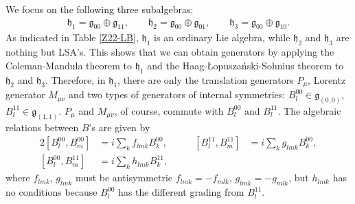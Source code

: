 \documentclass[a4paper,12pt]{article}
\def\nn{\nonumber}
\def\g{\mathfrak{g}}
\def\h{\mathfrak{h}}
\def\HLS{Haag-\L opusza\'nski-Sohnius }
\def\CM{Coleman-Mandula }
\theoremstyle{plain}
\theoremstyle{definition}
\begin{document}
We focus on the following three subalgebras:
\begin{align*}
 \h_1=\g_{00}\oplus\g_{11},\qquad  \h_2=\g_{00}\oplus\g_{01},\qquad \h_3=\g_{00}\oplus\g_{10}.
\end{align*}
As indicated in Table \ref{Z22-LB}, $\h_1$ is an ordinary Lie algebra, while $\h_2$ and $\h_3$ are nothing but LSA's. 
This shows that we can obtain generators by applying the \CM theorem to $\h_1$ and the \HLS theorem to $\h_2$ and $\h_3$. 
Therefore, in $\h_1$, there are only the translation generators $P_\mu$, Lorentz generator $M_{\mu\nu}$ and two types of generators of internal symmetries: $B_l^{00}\in \g_{(0,0)}$, $B_l^{11}\in\g_{(1,1)}$. 
$P_\mu$ and $M_{\mu\nu}$, of course, commute with $B^{00}_l$ and $B^{11}_l$.
The algebraic relations between $B$'s are given by
\begin{alignat}{2}
 [B_l^{00},B_m^{00}]&=i \sum_k f_{lmk} B_k^{00},\qquad &
 [B_l^{11},B_m^{11}]&=i \sum_k g_{lmk} B_k^{00},\nn\\
 [B_l^{00},B_m^{11}]&=i \sum_k h_{lmk} B_k^{11},
\end{alignat}
where $f_{lmk}$, $g_{lmk}$ must be antisymmetric $f_{lmk}=-f_{mlk}$, $g_{lmk}=-g_{mlk}$, but $h_{lmk}$ has no conditions because $B^{00}_l$ has the different grading from $B^{11}_l$.
\end{document}

